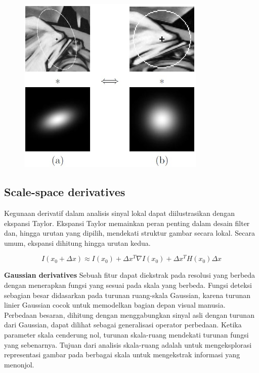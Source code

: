 \begin{figure}
  \centering{}
  \includegraphics[width=0.8\textwidth]{gambar/Smoothing gaussian kernel.jpg}
  \caption{}
\end{figure}

\subsection{\textbf{Scale-space derivatives}}

Kegunaan derivatif dalam analisis sinyal lokal dapat diilustrasikan dengan ekspansi Taylor. 
Ekspansi Taylor memainkan peran penting dalam desain filter dan, hingga urutan yang dipilih, 
mendekati struktur gambar secara lokal. Secara umum, ekspansi dihitung hingga urutan kedua.

\begin{equation*}
  I(x_{0} +\Delta x) \approx I(x_{0}) + \Delta x^{T}\nabla  I(x_{0}) + \Delta x^{T} H(x_{0}) \Delta x
\end{equation*}

\textbf{Gaussian derivatives} Sebuah fitur dapat diekstrak pada resolusi yang berbeda dengan 
menerapkan fungsi yang sesuai pada skala yang berbeda. Fungsi deteksi sebagian besar didasarkan 
pada turunan ruang-skala Gaussian, karena turunan linier Gaussian cocok untuk memodelkan 
bagian depan visual manusia. Perbedaan besaran, dihitung dengan menggabungkan sinyal asli 
dengan turunan dari Gaussian, dapat dilihat sebagai generalisasi operator perbedaan. Ketika 
parameter skala cenderung nol, turunan skala-ruang mendekati turunan fungsi yang sebenarnya. 
Tujuan dari analisis skala-ruang adalah untuk mengeksplorasi representasi gambar pada 
berbagai skala untuk mengekstrak informasi yang menonjol.

